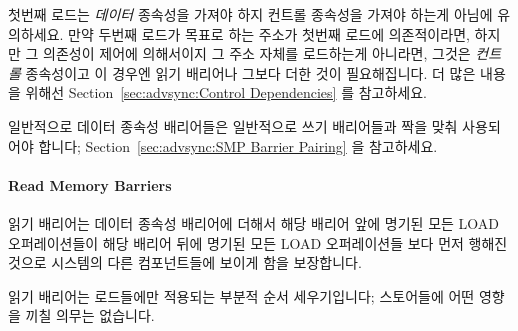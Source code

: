 \begin{enumerate}
첫번째 로드는 \emph{데이터} 종속성을 가져야 하지 컨트롤 종속성을
가져야 하는게 아님에 유의하세요.
만약 두번째 로드가 목표로 하는 주소가 첫번째 로드에 의존적이라면, 하지만 그
의존성이 제어에 의해서이지 그 주소 자체를 로드하는게 아니라면, 그것은
\emph{컨트롤} 종속성이고 이 경우엔 읽기 배리어나 그보다 더한 것이 필요해집니다.
더 많은 내용을 위해선 Section~\ref{sec:advsync:Control Dependencies} 를
참고하세요.

일반적으로 데이터 종속성 배리어들은 일반적으로 쓰기 배리어들과 짝을
맞춰 사용되어야 합니다; Section~\ref{sec:advsync:SMP Barrier Pairing} 을
참고하세요.

\paragraph{Read Memory Barriers}

읽기 배리어는 데이터 종속성 배리어에 더해서 해당 배리어 앞에 명기된 모든 LOAD
오퍼레이션들이 해당 배리어 뒤에 명기된 모든 LOAD 오퍼레이션들 보다 먼저 행해진
것으로 시스템의 다른 컴포넌트들에 보이게 함을 보장합니다.

읽기 배리어는 로드들에만 적용되는 부분적 순서 세우기입니다; 스토어들에 어떤
영향을 끼칠 의무는 없습니다.


\end{enumerate}
